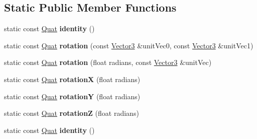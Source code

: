 \subsection*{Static Public Member Functions}
\begin{DoxyCompactItemize}
\item 
\mbox{\label{classVectormath_1_1Aos_1_1Quat_a0666e121d583cab3d661c34f00c18482}} 
static const \hyperlink{classVectormath_1_1Aos_1_1Quat}{Quat} {\bfseries identity} ()
\item 
\mbox{\label{classVectormath_1_1Aos_1_1Quat_a6a868e1e4a79743cdfd707fb4edb29b6}} 
static const \hyperlink{classVectormath_1_1Aos_1_1Quat}{Quat} {\bfseries rotation} (const \hyperlink{classVectormath_1_1Aos_1_1Vector3}{Vector3} \&unit\+Vec0, const \hyperlink{classVectormath_1_1Aos_1_1Vector3}{Vector3} \&unit\+Vec1)
\item 
\mbox{\label{classVectormath_1_1Aos_1_1Quat_a856e24fd0405ff0adedc52195b4027b6}} 
static const \hyperlink{classVectormath_1_1Aos_1_1Quat}{Quat} {\bfseries rotation} (float radians, const \hyperlink{classVectormath_1_1Aos_1_1Vector3}{Vector3} \&unit\+Vec)
\item 
\mbox{\label{classVectormath_1_1Aos_1_1Quat_a4388b6f41db32fb8e368df5cc72103a6}} 
static const \hyperlink{classVectormath_1_1Aos_1_1Quat}{Quat} {\bfseries rotationX} (float radians)
\item 
\mbox{\label{classVectormath_1_1Aos_1_1Quat_acd31310808dec804beb0bc2572b29bb4}} 
static const \hyperlink{classVectormath_1_1Aos_1_1Quat}{Quat} {\bfseries rotationY} (float radians)
\item 
\mbox{\label{classVectormath_1_1Aos_1_1Quat_a3c1a75528fe25cb49c4c3c01d7a24b1f}} 
static const \hyperlink{classVectormath_1_1Aos_1_1Quat}{Quat} {\bfseries rotationZ} (float radians)
\item 
\mbox{\label{classVectormath_1_1Aos_1_1Quat_ab553fa51545d2a4df531bee913c610dc}} 
static const \hyperlink{classVectormath_1_1Aos_1_1Quat}{Quat} {\bfseries identity} ()
\item 

\end{DoxyCompactItemize}
